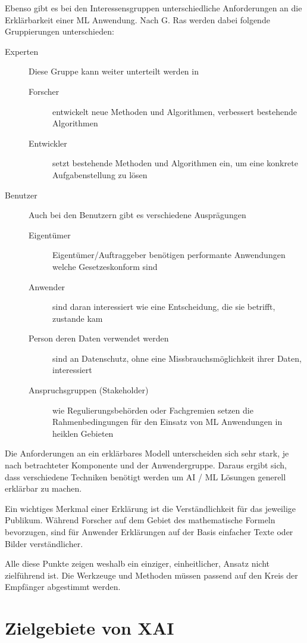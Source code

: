 \documentclass[
  12pt, %
  a4paper, %
  oneside, %
  openany, 
  numbers=noenddot, %
  BCOR=5mm, %
  parskip=half*, %
  thesis, %
]{bfhbook}
\begin{document}
Ebenso gibt es bei den Interessensgruppen unterschiedliche Anforderungen an die Erklärbarkeit einer ML Anwendung. Nach G. Ras \parencite{Ras2018} werden dabei folgende Gruppierungen unterschieden:
\begin{description}
  \item[Experten]
  Diese Gruppe kann weiter unterteilt werden in
  	\begin{description}
  		\item[Forscher] entwickelt neue Methoden und Algorithmen, verbessert bestehende Algorithmen
  		\item[Entwickler] setzt bestehende Methoden und Algorithmen ein, um eine konkrete Aufgabenstellung zu lösen
	\end{description}
  \item[Benutzer]
  Auch bei den Benutzern gibt es verschiedene Ausprägungen
  	\begin{description}
  		\item[Eigentümer] Eigentümer/Auftraggeber benötigen performante Anwendungen welche Gesetzeskonform sind
  		\item[Anwender] sind daran interessiert wie eine Entscheidung, die sie betrifft, zustande kam
  		\item[Person deren Daten verwendet werden] sind an Datenschutz, ohne eine Missbrauchsmöglichkeit ihrer Daten, interessiert
  		\item[Anspruchsgruppen (Stakeholder)] wie Regulierungsbehörden oder Fachgremien setzen die Rahmenbedingungen für den Einsatz von \Gls{ML} Anwendungen in heiklen Gebieten
	\end{description}
\end{description}
Die Anforderungen an ein erklärbares Modell unterscheiden sich sehr stark, je nach betrachteter Komponente und der Anwendergruppe. Daraus ergibt sich, dass verschiedene Techniken benötigt werden um \Gls{AI} / \Gls{ML} Lösungen generell erklärbar zu machen.

Ein wichtiges Merkmal einer Erklärung ist die Verständlichkeit für das jeweilige Publikum. Während Forscher auf dem Gebiet des  mathematische Formeln bevorzugen, sind für Anwender Erklärungen auf der Basis einfacher Texte oder Bilder verständlicher.

Alle diese Punkte zeigen weshalb ein einziger, einheitlicher, Ansatz nicht zielführend ist. Die Werkzeuge und Methoden müssen passend auf den Kreis der Empfänger abgestimmt werden.

\chapter{Zielgebiete von XAI}
\end{document}
